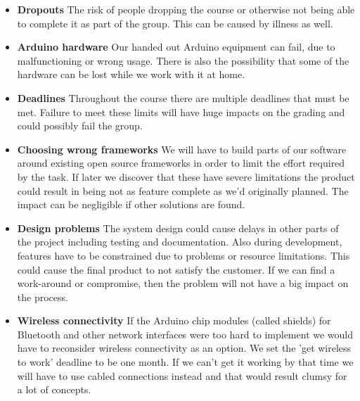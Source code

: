 \begin{itemize}

	\item \textbf{Dropouts}\newline
		The risk of people dropping the course or otherwise not being able to complete it as part
		of the group. This can be caused by illness as well.

	\item \textbf{Arduino hardware}\newline
		Our handed out Arduino equipment can fail, due to malfunctioning or wrong usage.
		There is also the possibility that some of the hardware can be lost while we work with it at home.

	\item \textbf{Deadlines}\newline
		Throughout the course there are multiple deadlines that must be met. Failure to meet
		these limits will have huge impacts on the grading and could possibly fail the group.

	\item \textbf{Choosing wrong frameworks}\newline
		We will have to build parts of our software around existing open source frameworks in order to limit the effort
		required by the task. If later we discover that these have severe limitations the product could result in
		being not as feature complete as we'd originally planned. The impact can be negligible if other solutions are found.

	\item \textbf{Design problems}\newline
		The system design could cause delays in other parts of the project
		including testing and documentation. Also during development, features have to be constrained due to problems
		or resource limitations. This could cause the final product to not satisfy the customer.
		If we can find a work-around or compromise, then the problem will not have a big impact on the process.

	\item \textbf{Wireless connectivity}\newline
		If the Arduino chip modules (called shields) for Bluetooth and other network interfaces were too
		hard to implement we would have to reconsider wireless connectivity as an option.
		We set the 'get wireless to work' deadline to be one month. If we can't get it working
		by that time we will have to use cabled connections instead and that would result clumsy
	for a lot of concepts.
\end{itemize}


